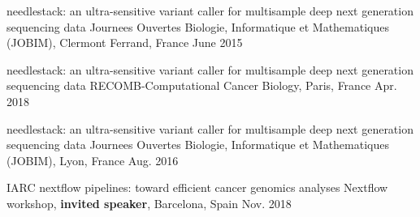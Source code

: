 \begin{cventries}
 
  \cvpublicationentry
    {} %
    {needlestack: an ultra-sensitive variant caller for multi­sample deep next
generation sequencing data} %
    {Journees Ouvertes Biologie, Informatique et Mathematiques (JOBIM), Clermont Ferrand, France} %
    {}
    {June 2015} %
    {} %

  \cvpublicationentry
    {} %
    {needlestack: an ultra-sensitive variant caller for multi­sample deep next
generation sequencing data} %
    {RECOMB-Computational Cancer Biology, Paris, France} %
    {}
    {Apr. 2018} %
    {} %

 
  \cvpublicationentry
    {} %
    {needlestack: an ultra-sensitive variant caller for multi­sample deep next
generation sequencing data} %
    {Journees Ouvertes Biologie, Informatique et Mathematiques (JOBIM), Lyon, France} %
    {}
    {Aug. 2016} %
    {} %

  \cvpublicationentry
    {} %
    {IARC nextflow pipelines: toward efficient cancer genomics analyses} %
    {Nextflow workshop, \textbf{invited speaker}, Barcelona, Spain} %
    {}
    {Nov. 2018} %
    {} %

\end{cventries}
